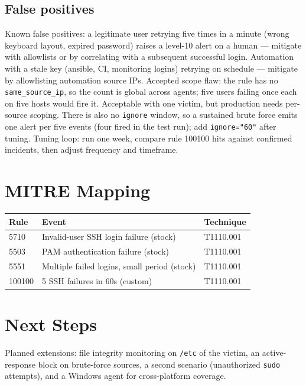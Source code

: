 \documentclass[11pt,a4paper]{article}
\begin{document}
\subsection{False positives}
Known false positives: a legitimate user retrying five times in a minute
(wrong keyboard layout, expired password) raises a level-10 alert on a
human --- mitigate with allowlists or by correlating with a subsequent
successful login. Automation with a stale key (ansible, CI, monitoring
logins) retrying on schedule --- mitigate by allowlisting automation source
IPs. Accepted scope flaw: the rule has no \texttt{same\_source\_ip}, so the
count is global across agents; five users failing once each on five hosts
would fire it. Acceptable with one victim, but production needs per-source
scoping. There is also no \texttt{ignore} window, so a sustained brute
force emits one alert per five events (four fired in the test run); add
\texttt{ignore="60"} after tuning. Tuning loop: run one week, compare rule
100100 hits against confirmed incidents, then adjust frequency and
timeframe.

\section{MITRE Mapping}
\begin{center}
{\small
\begin{tabular}{@{}lll@{}}
\hline
Rule & Event & Technique \\
\hline
5710 & Invalid-user SSH login failure (stock) & T1110.001 \\
5503 & PAM authentication failure (stock) & T1110.001 \\
5551 & Multiple failed logins, small period (stock) & T1110.001 \\
100100 & 5 SSH failures in 60s (custom) & T1110.001 \\
\hline
\end{tabular}
}
\end{center}

\section{Next Steps}
Planned extensions: file integrity monitoring on \texttt{/etc} of the
victim, an active-response block on brute-force sources, a second scenario
(unauthorized \texttt{sudo} attempts), and a Windows agent for cross-platform
coverage.
\end{document}
